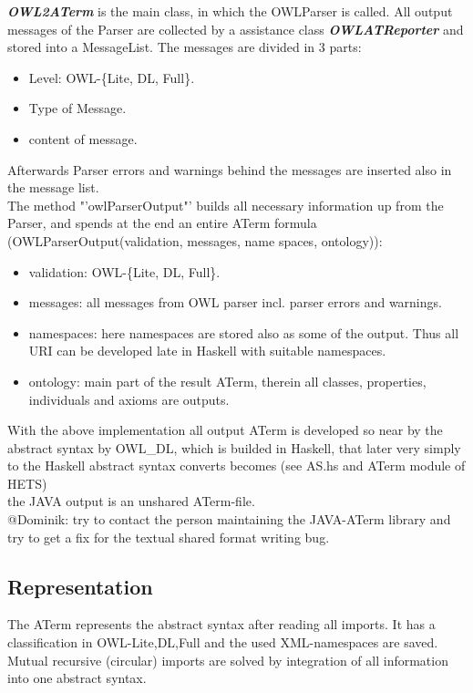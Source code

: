 \documentclass[11pt,a4paper]{article}
\begin{document}
\textbf{\emph{OWL2ATerm}} is the main class, in which the OWLParser is called.  All output messages of the Parser are collected by a assistance class \textbf{\emph{OWLATReporter}} and stored into a MessageList.  The messages are divided in 3 parts:
        \begin{itemize}
                \item Level: OWL-\{Lite, DL, Full\}.
                \item Type of Message.
                \item content of message.
        \end{itemize} 
Afterwards Parser errors and warnings behind the messages are inserted also in the message list. \\
The method "'owlParserOutput"' builds all necessary information up from the Parser, and spends at the end an entire ATerm formula (OWLParserOutput(validation, messages, name spaces, ontology)):
        \begin{itemize}
                \item validation: OWL-\{Lite, DL, Full\}.
                \item messages: all messages from OWL parser incl. parser errors and warnings.
                \item namespaces: here namespaces are stored also as some of the output. Thus all URI can be developed late in Haskell with suitable namespaces.
                \item ontology: main part of the result ATerm, therein all classes, properties, individuals and axioms are outputs.
        \end{itemize} 
   With the above implementation all output ATerm is developed so near by the abstract syntax by OWL\_DL, which is builded in Haskell, that later very simply to the Haskell abstract syntax converts becomes (see AS.hs and ATerm module of HETS)\\

   the JAVA output is an unshared ATerm-file.\\

   @Dominik: try to contact the person maintaining the JAVA-ATerm
   library and try to get a fix for the textual shared format writing
   bug. 

\subsection{Representation}
The ATerm represents the abstract syntax after reading all
   imports. It has a classification in OWL-{Lite,DL,Full} and the used
   XML-namespaces are saved. Mutual recursive (circular) imports are
   solved by integration of all information into one abstract syntax.
\end{document}
